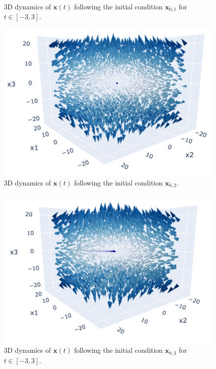 \documentclass[12pt]{article}
\begin{document}
\begin{enumerate}
\begin{figure}[h!]
    \caption{3D dynamics of $\mathbf{x}(t)$ following the initial condition $\mathbf{x}_{0,1}$ for $t \in [-3, 3]$.}
\end{figure}
\begin{figure}[h!]
    \centering
    \includegraphics[width=1\textwidth]{Figures/2.png}
    \caption{3D dynamics of $\mathbf{x}(t)$ following the initial condition $\mathbf{x}_{0,2}$.}
\end{figure}
\begin{figure}[h!]
    \centering
    \includegraphics[width=1\textwidth]{Figures/3.png}
    \caption{3D dynamics of $\mathbf{x}(t)$ following the initial condition $\mathbf{x}_{0,3}$ for $t \in [-3, 3]$.}
\end{figure}
\begin{figure}[h!]
    \centering

\end{figure}
\end{enumerate}
\end{document}
